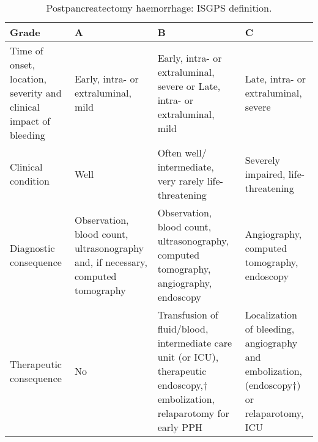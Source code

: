 \begin{sidewaystable}[htbp]
\caption{Postpancreatectomy haemorrhage: ISGPS definition.}
\label{table:isgps_pph}
\begin{tabular}{|m{4cm}|m{4cm}|m{5cm}|m{5cm}|}
	\hline
	Grade                                                             & A                                                                                & B                                                                                                                             & C                                                                                         \\ \hline
	Time of onset, location, severity and clinical impact of bleeding & Early, intra- or extraluminal, mild                                              & Early, intra- or extraluminal, severe	or Late, intra- or extraluminal, mild                                                   & Late, intra- or extraluminal, severe                                                      \\
	Clinical condition                                                & Well                                                                             & Often well/ intermediate, very rarely life-threatening                                                                        & Severely impaired, life-threatening                                                       \\
	Diagnostic consequence                                            & Observation, blood count, ultrasonography and, if necessary, computed tomography & Observation, blood count, ultrasonography, computed tomography, angiography, endoscopy                                        & Angiography, computed tomography, endoscopy                                               \\
	Therapeutic consequence                                           & No                                                                               & Transfusion of fluid/blood, intermediate care unit (or ICU), therapeutic endoscopy,† embolization, relaparotomy for early PPH & Localization of bleeding, angiography and embolization, (endoscopy†) or relaparotomy, ICU \\ \hline
\end{tabular}
\end{sidewaystable}